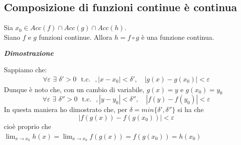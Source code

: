 \documentclass{article}
\theoremstyle{definition}
\begin{document}
\subsection{Composizione di funzioni continue è continua}
Sia $x_0 \in Acc(f) \cap Acc(g) \cap Acc(h)$.
\\
Siano $f$ e $g$ funzioni continue. Allora $h= f\circ g$ è una funzione continua.
\begin{center}
    \textbf{\textit{Dimostrazione}}
\end{center}
Sappiamo che:
\begin{align}
    \forall \varepsilon \,\, \exists \,\, \delta' > 0 \,\,\,\, \mbox{t.c.}\,\,\,\,, |x-x_0| < \delta', \,\,\,\,\,\, |g(x)-g(x_0)| < \varepsilon
\end{align}
Dunque è noto che, con un cambio di variabile, $g(x)=y$ e $g(x_0)=y_0$
\begin{equation}
    \forall \varepsilon \,\, \exists \,\, \delta'' > 0 \,\,\,\, \mbox{t.c.}\,\,\,\,, |y-y_0| < \delta'', \,\,\,\,\,\, |f(y)-f(y_0)| < \varepsilon
\end{equation}
In questa maniera ho dimostrato che, per $\delta=min\{\delta',\delta''\}$ si ha che
\begin{equation}
    |f(g(x))-f(g(x_0))|< \varepsilon
\end{equation}
cioè proprio che $\lim_{x \to x_0}h(x)=\lim_{x \to x_0} f(g(x))= f(g(x_0))=h(x_0)$
\end{document}
